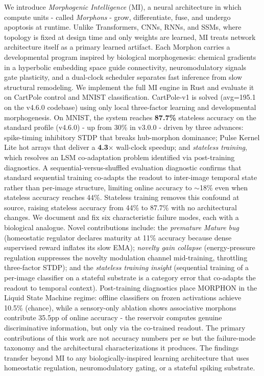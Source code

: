 We introduce \emph{Morphogenic Intelligence} (MI), a neural architecture in which compute units - called \emph{Morphons} - grow, differentiate, fuse, and undergo apoptosis at runtime. Unlike Transformers, CNNs, RNNs, and SSMs, where topology is fixed at design time and only weights are learned, MI treats network architecture itself as a primary learned artifact. Each Morphon carries a developmental program inspired by biological morphogenesis: chemical gradients in a hyperbolic embedding space guide connectivity, neuromodulatory signals gate plasticity, and a dual-clock scheduler separates fast inference from slow structural remodeling. We implement the full MI engine in Rust and evaluate it on CartPole control and MNIST classification. CartPole-v1 is solved (avg=195.1 on the v4.6.0 codebase) using only local three-factor learning and developmental morphogenesis. On MNIST, the system reaches \textbf{87.7\%} stateless accuracy on the standard profile (v4.6.0) - up from 30\% in v3.0.0 - driven by three advances: spike-timing inhibitory STDP \citep{vogels2011inhibitory} that breaks hub-morphon dominance; Pulse Kernel Lite hot arrays that deliver a \textbf{4.3$\times$} wall-clock speedup; and \emph{stateless training}, which resolves an LSM co-adaptation problem identified via post-training diagnostics. A sequential-versus-shuffled evaluation diagnostic confirms that standard sequential training co-adapts the readout to inter-image temporal state rather than per-image structure, limiting online accuracy to $\sim$18\% even when stateless accuracy reaches 44\%. Stateless training removes this confound at source, raising stateless accuracy from 44\% to 87.7\% with no architectural changes. We document and fix six characteristic failure modes, each with a biological analogue. Novel contributions include: the \emph{premature Mature bug} (homeostatic regulator declares maturity at 11\% accuracy because dense supervised reward inflates its slow EMA); \emph{novelty gain collapse} (energy-pressure regulation suppresses the novelty modulation channel mid-training, throttling three-factor STDP); and the \emph{stateless training insight} (sequential training of a per-image classifier on a stateful substrate is a category error that co-adapts the readout to temporal context). Post-training diagnostics place MORPHON in the Liquid State Machine regime: offline classifiers on frozen activations achieve 10.5\% (chance), while a sensory-only ablation shows associative morphons contribute 35.5pp of online accuracy - the reservoir computes genuine discriminative information, but only via the co-trained readout. The primary contributions of this work are not accuracy numbers per se but the failure-mode taxonomy and the architectural characterizations it produces. The findings transfer beyond MI to any biologically-inspired learning architecture that uses homeostatic regulation, neuromodulatory gating, or a stateful spiking substrate.
